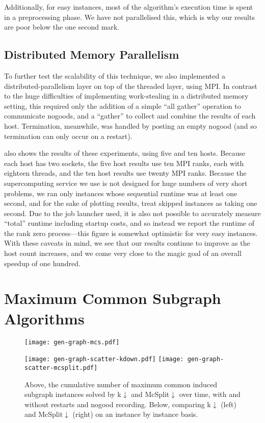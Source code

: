 \documentclass[runningheads]{llncs}
\begin{document}
Additionally, for easy instances, most of the algorithm's execution time is spent in a preprocessing
phase. We have not parallelised this, which is why our results are poor below the one second mark.

\subsection{Distributed Memory Parallelism}

To further test the scalability of this technique, we also implemented a distributed-parallelism
layer on top of the threaded layer, using MPI. In contrast to the huge difficulties of implementing
work-stealing in a distributed memory setting, this required only the addition of a simple ``all
gather'' operation to communicate nogoods, and a ``gather'' to collect and combine the results of
each host. Termination, meanwhile, was handled by posting an empty nogood (and so termination can
only occur on a restart).

 also shows the results of these experiments, using five and ten hosts.
Because each host has two sockets, the five host results use ten MPI ranks, each with eighteen
threads, and the ten host results use twenty MPI ranks. Because the supercomputing service we use is
not designed for huge numbers of very short problems, we ran only instances whose sequential runtime
was at least one second, and for the sake of plotting results, treat skipped instances as taking one
second. Due to the job launcher used, it is also not possible to accurately measure ``total''
runtime including startup costs, and so instead we report the runtime of the rank zero
process---this figure is somewhat optimistic for very easy instances. With these caveats in mind, we
see that our results continue to improve as the host count increases, and we come very close to the
magic goal of an overall speedup of one hundred.

\section{Maximum Common Subgraph Algorithms}

\begin{figure}[tb]
    \centering
    \texttt{[image: gen-graph-mcs.pdf]}

    \medskip

    \texttt{[image: gen-graph-scatter-kdown.pdf]}
    \hfill
    \texttt{[image: gen-graph-scatter-mcsplit.pdf]}

    \caption{Above, the cumulative number of maximum common induced subgraph instances solved by
    k${\downarrow}$ and McSplit${\downarrow}$ over time, with and without restarts and nogood
    recording. Below, comparing k${\downarrow}$ (left) and McSplit${\downarrow}$ (right) on an instance by instance
    basis.}\label{figure:mcs}
\end{figure}
\end{document}
